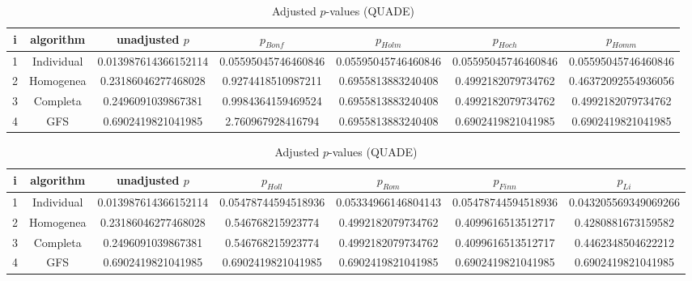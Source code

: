 \documentclass[a4paper,10pt]{article}
\begin{document}
\begin{landscape}
\newpage

\begin{table}[!htp]
\centering\scriptsize
\caption{Adjusted $p$-values (QUADE)}
\begin{tabular}{ccccccc}
i&algorithm&unadjusted $p$&$p_{Bonf}$&$p_{Holm}$&$p_{Hoch}$&$p_{Homm}$\\
\hline
1&Individual&0.013987614366152114&0.05595045746460846&0.05595045746460846&0.05595045746460846&0.05595045746460846\\
2&Homogenea&0.23186046277468028&0.9274418510987211&0.6955813883240408&0.4992182079734762&0.46372092554936056\\
3&Completa&0.2496091039867381&0.9984364159469524&0.6955813883240408&0.4992182079734762&0.4992182079734762\\
4&GFS&0.6902419821041985&2.760967928416794&0.6955813883240408&0.6902419821041985&0.6902419821041985\\
\hline
\end{tabular}
\end{table}

\begin{table}[!htp]
\centering\scriptsize
\caption{Adjusted $p$-values (QUADE)}
\begin{tabular}{ccccccc}
i&algorithm&unadjusted $p$&$p_{Holl}$&$p_{Rom}$&$p_{Finn}$&$p_{Li}$\\
\hline
1&Individual&0.013987614366152114&0.05478744594518936&0.05334966146804143&0.05478744594518936&0.043205569349069266\\
2&Homogenea&0.23186046277468028&0.546768215923774&0.4992182079734762&0.4099616513512717&0.4280881673159582\\
3&Completa&0.2496091039867381&0.546768215923774&0.4992182079734762&0.4099616513512717&0.4462348504622212\\
4&GFS&0.6902419821041985&0.6902419821041985&0.6902419821041985&0.6902419821041985&0.6902419821041985\\
\hline
\end{tabular}
\end{table}

\end{landscape}
\end{document}
